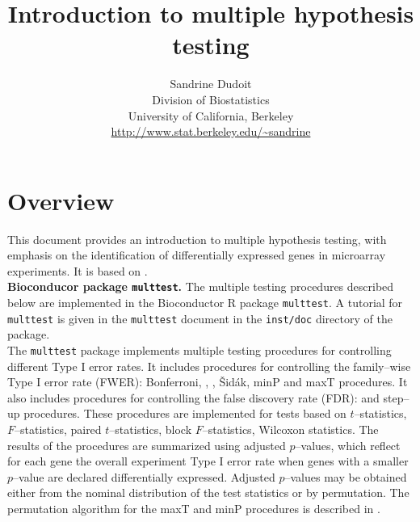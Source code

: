 \documentclass[11pt]{article}
\begin{document}
\title{\bf Introduction to multiple hypothesis testing}
\author{Sandrine Dudoit\\
Division of Biostatistics\\
University of California, Berkeley\\
\url{http://www.stat.berkeley.edu/~sandrine}}

\maketitle

\vspace{2cm}

\tableofcontents

\newpage

\section{Overview}

This document provides an introduction to multiple hypothesis testing, with emphasis on the identification of differentially expressed genes in microarray experiments. It is based on \cite{Dudoit&Shaffer02}. \\

{\bf Bioconducor package {\tt multtest}.} The multiple testing procedures described below are implemented in the Bioconductor R package {\tt multtest}. A tutorial for {\tt multtest} is given in the {\tt multtest} document in the {\tt inst/doc} directory of the package. \\

The {\tt multtest} package implements multiple testing procedures for controlling different Type I error rates. It includes procedures for controlling the family--wise Type I error rate (FWER): Bonferroni, \cite{Hochberg88}, \cite{Holm79}, \v{S}id\'{a}k, \cite{Westfall&Young93} minP and maxT procedures. It also includes procedures for controlling the false discovery rate (FDR): \cite{Benjamini&Hochberg95} and \cite{Benjamini&Yekutieli01} step--up procedures. These procedures are implemented for tests based on $t$--statistics, $F$--statistics, paired $t$--statistics, block $F$--statistics, Wilcoxon statistics. The results of the procedures are summarized using adjusted $p$--values, which reflect for each gene the overall experiment Type I error rate when genes with a smaller $p$--value are declared differentially expressed. Adjusted $p$--values may be obtained either from the nominal distribution of the test statistics or by permutation. The permutation algorithm for the maxT and minP procedures is described in \cite{Ge&Dudoit}.\\
\end{document}
